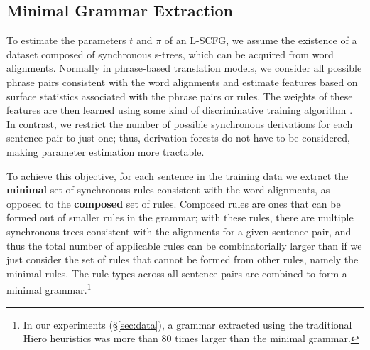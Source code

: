\documentclass[11pt]{article}
\newcommand{\cjd}[1]{\textcolor{red}{\textbf{[#1 --CJD] }}}
\begin{document}
\subsection{Minimal Grammar Extraction}
\label{sec:mingrammar}
To estimate the parameters $t$ and $\pi$ of an L-SCFG, we assume the existence of a dataset composed of synchronous s-trees, which can be acquired from word alignments.  
Normally in phrase-based translation models, we consider all possible phrase pairs consistent with the word alignments and estimate features based on surface statistics associated with the phrase pairs or rules. 
The weights of these features are then learned using some kind of discriminative training algorithm \cite{Och2003,Chiang2012}.  
In contrast, we restrict the number of possible synchronous derivations for each sentence pair to just one; thus, derivation forests do not have to be considered, making parameter estimation more tractable.  

To achieve this objective, for each sentence in the training data we extract the {\bf minimal} set of synchronous rules consistent with the word alignments, as opposed to the {\bf composed} set of rules.  
Composed rules are ones that can be formed out of smaller rules in the grammar; with these rules, there are multiple synchronous trees consistent with the alignments for a given sentence pair, and thus the total number of applicable rules can be combinatorially larger than if we just consider the set of rules that cannot be formed from other rules, namely the minimal rules.  
The rule types across all sentence pairs are combined to form a minimal grammar.\footnote{In our experiments (\S\ref{sec:data}), a grammar extracted using the traditional Hiero heuristics was more than 80 times larger than the minimal grammar.} 
\end{document}
